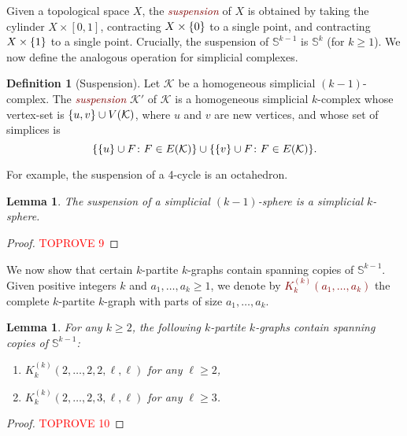 \documentclass[12pt,reqno]{amsart}
\theoremstyle{plain}
\newtheorem{lemma}[theorem]{Lemma}
\theoremstyle{definition}
\newtheorem{definition}[theorem]{Definition}
\numberwithin{equation}{section}
\DeclarePairedDelimiter{\set}{\{}{\}}
\renewcommand{\ge}{\geqslant}
\renewcommand{\geq}{\geqslant}
\newcommand{\defn}[1]{\textcolor{Maroon}{\emph{#1}}}
\newcommand{\bS}{\mathbb{S}}
\newcommand{\cK}{\mathcal{K}}
\begin{document}
	Given a topological space $X$, the \defn{suspension} of $X$ is obtained by taking the cylinder $X \times [0, 1]$, contracting $X \times \set{0}$ to a single point, and contracting $X \times \set{1}$ to a single point. Crucially, the suspension of $\bS^{k - 1}$ is $\bS^k$ (for $k \geq 1$). We now define the analogous operation for simplicial complexes.
	
	\begin{definition}[Suspension]
		Let $\cK$ be a homogeneous simplicial $(k - 1)$-complex. The \defn{suspension} $\cK'$ of $\cK$ is a homogeneous simplicial $k$-complex whose vertex-set is $\set{u, v} \cup V(\cK)$, where $u$ and $v$ are new vertices, and whose set of simplices is
		\begin{equation*}
			\set{\set{u} \cup F \colon F \in E(\cK)} \cup \set{\set{v} \cup F \colon F \in E(\cK)}.
		\end{equation*}
	\end{definition}
	
	For example, the suspension of a 4-cycle is an octahedron.
	
	\begin{lemma}\label{lem:suspensions}
		The suspension of a simplicial $(k - 1)$-sphere is a simplicial $k$-sphere.
	\end{lemma}
	
	\begin{proof}\textcolor{red}{TOPROVE 9}\end{proof}
	
	We now show that certain $k$-partite $k$-graphs contain spanning copies of $\bS^{k - 1}$.
	Given positive integers $k$ and $a_1, \dotsc, a_k \ge 1$, we denote by \defn{$K_k^{(k)}(a_1, \dotsc, a_k)$} the complete $k$-partite $k$-graph with parts of size $a_1, \dotsc, a_k$.
	
	\begin{lemma}\label{lem:partitesphere}
		For any $k \geq 2$, the following $k$-partite $k$-graphs contain spanning copies of $\bS^{k - 1}$\textup{:}
		\begin{enumerate}[label = \textup{(}\alph*\textup{)}]
			\item \label{itm:partitesphere-a} $K_k^{(k)}(2, \dotsc, 2, 2, \ell, \ell)$ for any $\ell \geq 2$,
			\item \label{itm:partitesphere-b} $K_k^{(k)}(2, \dotsc, 2, 3, \ell, \ell)$ for any $\ell \geq 3$.
		\end{enumerate}
	\end{lemma}
	
	\begin{proof}\textcolor{red}{TOPROVE 10}\end{proof}
	
\end{document}

